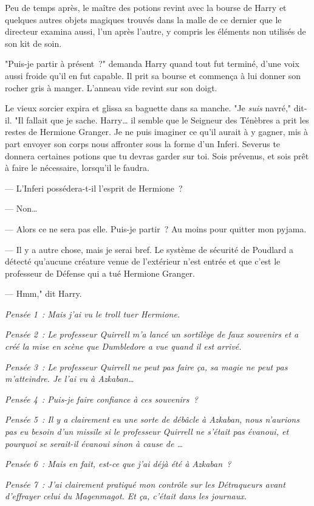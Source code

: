 Peu de temps après, le maître des potions revint avec la bourse de Harry et quelques autres objets magiques trouvés dans la malle de ce dernier que le directeur examina aussi, l'un après l'autre, y compris les éléments non utilisés de son kit de soin.

"Puis-je partir à présent~?" demanda Harry quand tout fut terminé, d'une voix aussi froide qu'il en fut capable. Il prit sa bourse et commença à lui donner son rocher gris à manger. L'anneau vide revint sur son doigt.

Le vieux sorcier expira et glissa sa baguette dans sa manche. "Je \emph{suis} navré," dit-il. "Il fallait que je sache. Harry… il semble que le Seigneur des Ténèbres a prit les restes de Hermione Granger. Je ne puis imaginer ce qu'il aurait à y gagner, mis à part envoyer son corps nous affronter sous la forme d'un Inferi. Severus te donnera certaines potions que tu devras garder sur toi. Sois prévenus, et sois prêt à faire le nécessaire, lorsqu'il le faudra.

--- L'Inferi possédera-t-il l'esprit de Hermione~?

--- Non…

--- Alors ce ne sera pas elle. Puis-je partir~? Au moins pour quitter mon pyjama.

--- Il y a autre chose, mais je serai bref. Le système de sécurité de Poudlard a détecté qu'aucune créature venue de l'extérieur n'est entrée et que c'est le professeur de Défense qui a tué Hermione Granger.

--- Hmm," dit Harry.

\emph{Pensée 1~: Mais j'ai vu le troll tuer Hermione.}

\emph{Pensée 2~: Le professeur Quirrell m'a lancé un sortilège de faux souvenirs et a créé la mise en scène que Dumbledore a vue quand il est arrivé.}

\emph{Pensée 3~: Le professeur Quirrell ne peut pas faire ça, sa magie ne peut pas m'atteindre. Je l'ai vu à Azkaban…}

\emph{Pensée 4~: Puis-je faire confiance à ces souvenirs~?}

\emph{Pensée 5~: Il y a clairement eu une sorte de débâcle à Azkaban, nous n'aurions pas eu besoin d'un missile si le professeur Quirrell ne s'était pas évanoui, et pourquoi se serait-il évanoui sinon à cause de …}

\emph{Pensée 6~: Mais en fait, est-ce que j'ai déjà été à Azkaban~?}

\emph{Pensée 7~: J'ai clairement pratiqué mon contrôle sur les Détraqueurs avant d'effrayer celui du Magenmagot. Et \emph{ça}, c'était dans les journaux.}

